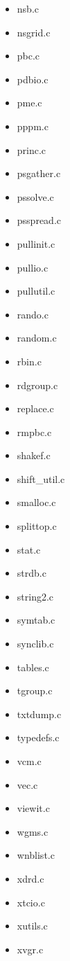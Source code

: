\begin{multicols}{3}
\begin{itemize}
\begin{itemize}
		\item nsb.c
		\item nsgrid.c
		\item pbc.c
		\item pdbio.c
		\item pme.c
		\item pppm.c
		\item princ.c
		\item psgather.c
		\item pssolve.c
		\item psspread.c
		\item pullinit.c
		\item pullio.c
		\item pullutil.c
		\item rando.c
		\item random.c
		\item rbin.c
		\item rdgroup.c
		\item replace.c
		\item rmpbc.c
		\item shakef.c
		\item shift\_util.c
		\item smalloc.c
		\item splittop.c
		\item stat.c
		\item strdb.c
		\item string2.c
		\item symtab.c
		\item synclib.c
		\item tables.c
		\item tgroup.c
		\item txtdump.c
		\item typedefs.c
		\item vcm.c
		\item vec.c
		\item viewit.c
		\item wgms.c
		\item wnblist.c
		\item xdrd.c
		\item xtcio.c
		\item xutils.c
		\item xvgr.c
	\end{itemize}


\end{itemize}
\end{multicols}
